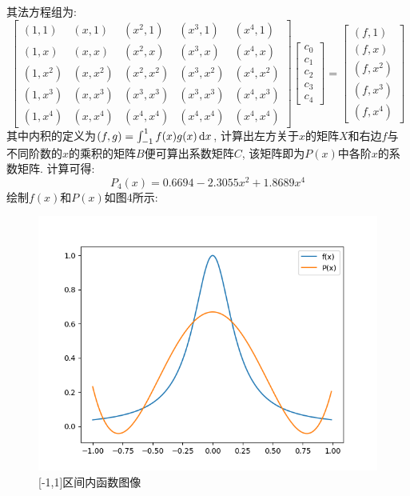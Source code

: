\documentclass[UTF8,9pt]{ctexart}
\begin{document}
其法方程组为:
$$\left[ {\begin{array}{*{20}{c}}
	{(1, 1)}&{(x, 1)}&{(x^2, 1)}&{(x^3, 1)}&{(x^4 ,1)}\\
	{(1, x )}&{(x, x )}&{(x^2, x)}&{(x^3, x)}&{(x^4 , x)}\\
	{(1, x^2 )}&{(x, x^2 )}&{(x^2, x^2)}&{(x^3, x^2)}&{(x^4 , x^2)}\\
	{(1, x^3 )}&{(x, x^3 )}&{(x^3, x^3)}&{(x^3, x^3)}&{(x^4 , x^3)}\\
	{(1, x^4 )}&{(x, x^4 )}&{(x^4, x^4)}&{(x^4, x^4)}&{(x^4 , x^4)}
	\end{array}} \right]\left[ {\begin{array}{*{20}{c}}
	{{c_0}}\\
	{{c_1}}\\
	{{c_2}}\\
	{{c_3}}\\
	{{c_4}}
	\end{array}} \right] = \left[ {\begin{array}{*{20}{c}}
	{(f,1)}\\
	{(f,x )}\\
	{(f,x^2 )}\\
	{(f,x^3 )}\\
	{(f,x^4 )}
	\end{array}} \right]$$
其中内积的定义为$(f,g)=\int_{-1}^1 f(x)g(x)\mathop{}\!\mathrm{d} x$, 计算出左方关于$x$的矩阵$X$和右边$f$与不同阶数的$x$的乘积的矩阵$B$便可算出系数矩阵$C$, 该矩阵即为$P(x)$中各阶$x$的系数矩阵. 计算可得:
$$P_4(x) =  0.6694-2.3055 x^2+1.8689 x^4$$
绘制$f(x)$和$P(x)$如图4所示: 
\begin{figure}[htbp]
	\centering
	\begin{minipage}[t]{0.48\textwidth}
	\centering
	\includegraphics[scale=0.4]{4.png}
	\caption{[-1,1]区间内函数图像}
	\end{minipage}
\end{figure}
\end{document}
